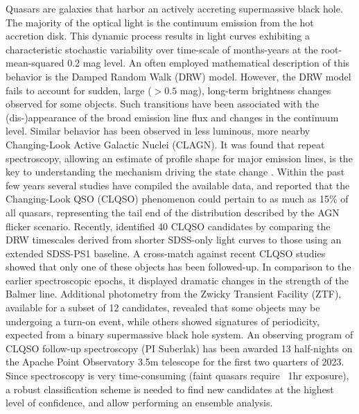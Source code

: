 \documentclass{aastex631}
\begin{document}
\thispagestyle{empty}  %

\author{Krzysztof Suberlak}

Quasars are galaxies that harbor an actively accreting supermassive black hole. The majority of the optical light is the continuum emission from the hot accretion disk. This dynamic process results in light curves exhibiting a characteristic stochastic variability over time-scale of months-years at the root-mean-squared 0.2 mag level. An often employed mathematical description of  this behavior is the Damped Random Walk (DRW) model. However, the DRW model fails to account for sudden, large ($>0.5$ mag), long-term brightness changes observed for some objects. Such transitions have been associated with the (dis-)appearance of the broad emission line flux and changes in the continuum level. Similar behavior has been observed in less luminous, more nearby Changing-Look Active Galactic Nuclei (CLAGN). It was found that repeat spectroscopy, allowing an estimate of profile shape for major emission lines, is the key to understanding the mechanism driving the state change \citep{macleod2019}. Within the past few years several studies have compiled the available data, and reported that the Changing-Look QSO (CLQSO) phenomenon could pertain to as much as  15\% of all quasars, representing the tail end of the distribution described by the AGN flicker scenario. Recently, \citealt{suberlak2021} identified 40 CLQSO candidates by comparing the DRW timescales derived from shorter SDSS-only light curves to those using an extended SDSS-PS1 baseline. A cross-match against recent CLQSO studies showed that only one of these objects has been followed-up.  In comparison to the earlier spectroscopic epochs, it displayed dramatic changes in the strength of the Balmer line. Additional photometry from the Zwicky Transient Facility (ZTF), available for a subset of 12 candidates, revealed that some objects may be undergoing a turn-on event, while others showed signatures of periodicity, expected from a binary supermassive black hole system. An observing program of CLQSO follow-up spectroscopy (PI Suberlak) has been awarded 13 half-nights  on the Apache Point Observatory 3.5m telescope for the first two quarters of 2023. Since spectroscopy is very time-consuming (faint quasars require ~1hr exposure), a robust classification scheme is needed to find new candidates at the highest level of confidence, and allow performing an ensemble analysis. 
\end{document}
